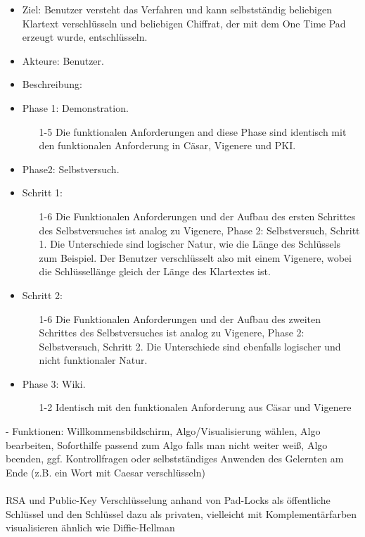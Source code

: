 \documentclass{article}
\begin{document}
\begin{itemize}[label={}]
\item Ziel: Benutzer versteht das Verfahren und kann selbstständig beliebigen Klartext verschlüsseln und beliebigen Chiffrat, 
      der mit dem One Time Pad erzeugt wurde, entschlüsseln.
\item Akteure: Benutzer.
\item Beschreibung:
\item Phase 1: Demonstration.
\begin{enumerate}
 \item[1-5] Die funktionalen Anforderungen and diese Phase sind identisch mit den 
            funktionalen Anforderung in Cäsar, Vigenere und PKI.
\end{enumerate}

\item Phase2: Selbstversuch.
\item Schritt 1:
\begin{enumerate}
\item[1-6] Die Funktionalen Anforderungen und der Aufbau des ersten Schrittes des Selbstversuches ist analog zu Vigenere, Phase 2: Selbstversuch, Schritt 1. 
           Die Unterschiede sind logischer Natur, wie die Länge des Schlüssels zum Beispiel. 
           Der Benutzer verschlüsselt also mit einem Vigenere, wobei die Schlüssellänge gleich der Länge des Klartextes ist.
\end{enumerate}

\item Schritt 2:
\begin{enumerate}
\item[1-6] Die Funktionalen Anforderungen und der Aufbau des zweiten Schrittes des Selbstversuches ist analog zu Vigenere, Phase 2: Selbstversuch, Schritt 2. 
           Die Unterschiede sind ebenfalls logischer und nicht funktionaler Natur.
\end{enumerate}
\item Phase 3: Wiki.
\begin{enumerate}
 \item[1-2] Identisch mit den funktionalen Anforderung aus Cäsar und Vigenere
\end{enumerate}
\end{itemize}

- Funktionen: Willkommensbildschirm, Algo/Visualisierung wählen, Algo bearbeiten,
Soforthilfe passend zum Algo falls man nicht weiter weiß, Algo beenden,
ggf. Kontrollfragen oder selbstständiges Anwenden des Gelernten am Ende (z.B. ein Wort mit Caesar verschlüsseln)
\\
\\
RSA und Public-Key Verschlüsselung anhand von Pad-Locks als
öffentliche Schlüssel und den Schlüssel  dazu als privaten,
vielleicht mit Komplementärfarben visualisieren ähnlich wie Diffie-Hellman
\end{document}
